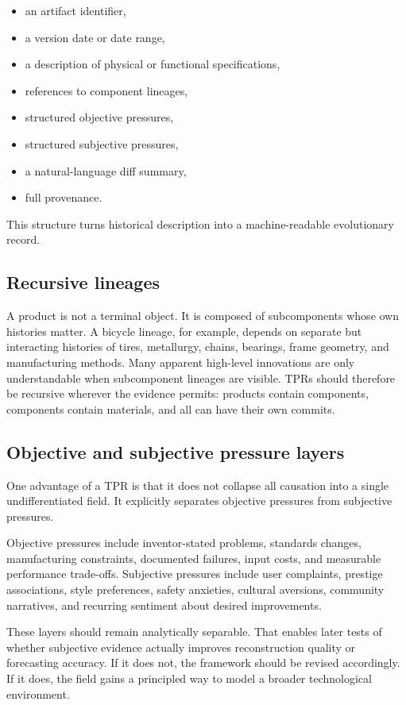 \documentclass[11pt]{article}
\begin{document}
\begin{itemize}
  \item an artifact identifier,
  \item a version date or date range,
  \item a description of physical or functional specifications,
  \item references to component lineages,
  \item structured objective pressures,
  \item structured subjective pressures,
  \item a natural-language diff summary,
  \item full provenance.
\end{itemize}

This structure turns historical description into a machine-readable evolutionary record.

\subsection{Recursive lineages}
A product is not a terminal object. It is composed of subcomponents whose own histories matter. A bicycle lineage, for example, depends on separate but interacting histories of tires, metallurgy, chains, bearings, frame geometry, and manufacturing methods. Many apparent high-level innovations are only understandable when subcomponent lineages are visible. TPRs should therefore be recursive wherever the evidence permits: products contain components, components contain materials, and all can have their own commits.

\subsection{Objective and subjective pressure layers}
One advantage of a TPR is that it does not collapse all causation into a single undifferentiated field. It explicitly separates objective pressures from subjective pressures.

Objective pressures include inventor-stated problems, standards changes, manufacturing constraints, documented failures, input costs, and measurable performance trade-offs. Subjective pressures include user complaints, prestige associations, style preferences, safety anxieties, cultural aversions, community narratives, and recurring sentiment about desired improvements.

These layers should remain analytically separable. That enables later tests of whether subjective evidence actually improves reconstruction quality or forecasting accuracy. If it does not, the framework should be revised accordingly. If it does, the field gains a principled way to model a broader technological environment.
\end{document}
